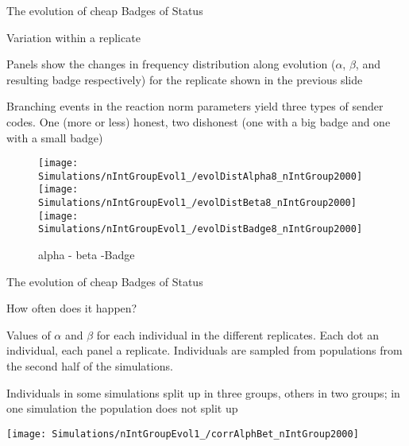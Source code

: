 \documentclass[
  ignorenonframetext,
]{beamer}
\begin{document}
\begin{frame}{The evolution of cheap Badges of Status}
\protect\hypertarget{the-evolution-of-cheap-badges-of-status-2}{}

\begin{block}{Variation within a replicate}

\tiny

Panels show the changes in frequency distribution along evolution
(\(\alpha\), \(\beta\), and resulting badge respectively) for the
replicate shown in the previous slide

Branching events in the reaction norm parameters yield three types of
sender codes. One (more or less) honest, two dishonest (one with a big
badge and one with a small badge)

\begin{figure}

\texttt{[image: Simulations/nIntGroupEvol1\_/evolDistAlpha8\_nIntGroup2000]} \texttt{[image: Simulations/nIntGroupEvol1\_/evolDistBeta8\_nIntGroup2000]} \texttt{[image: Simulations/nIntGroupEvol1\_/evolDistBadge8\_nIntGroup2000]} \hfill{}

\caption{alpha - beta -Badge}\label{fig:unnamed-chunk-10}
\end{figure}

\end{block}

\end{frame}

\begin{frame}{The evolution of cheap Badges of Status}
\protect\hypertarget{the-evolution-of-cheap-badges-of-status-3}{}

\begin{block}{How often does it happen?}

\tiny

Values of \(\alpha\) and \(\beta\) for each individual in the different
replicates. Each dot an individual, each panel a replicate. Individuals
are sampled from populations from the second half of the simulations.

Individuals in some simulations split up in three groups, others in two
groups; in one simulation the population does not split up

\begin{flushleft}\texttt{[image: Simulations/nIntGroupEvol1\_/corrAlphBet\_nIntGroup2000]} \end{flushleft}

\end{block}

\end{frame}
\end{document}
